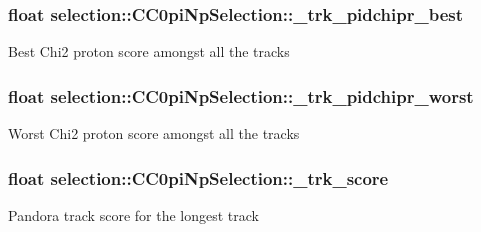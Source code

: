 \subsubsection[{\texorpdfstring{\+\_\+trk\+\_\+pidchipr\+\_\+best}{_trk_pidchipr_best}}]{\setlength{\rightskip}{0pt plus 5cm}float selection\+::\+C\+C0pi\+Np\+Selection\+::\+\_\+trk\+\_\+pidchipr\+\_\+best\hspace{0.3cm}{\ttfamily [private]}}\hypertarget{classselection_1_1CC0piNpSelection_aaf0a2841494bc52da55d267bc3c8db3d}{}\label{classselection_1_1CC0piNpSelection_aaf0a2841494bc52da55d267bc3c8db3d}
Best Chi2 proton score amongst all the tracks 
\subsubsection[{\texorpdfstring{\+\_\+trk\+\_\+pidchipr\+\_\+worst}{_trk_pidchipr_worst}}]{\setlength{\rightskip}{0pt plus 5cm}float selection\+::\+C\+C0pi\+Np\+Selection\+::\+\_\+trk\+\_\+pidchipr\+\_\+worst\hspace{0.3cm}{\ttfamily [private]}}\hypertarget{classselection_1_1CC0piNpSelection_a6c06ff43f89cbee19cf466b830a6fe38}{}\label{classselection_1_1CC0piNpSelection_a6c06ff43f89cbee19cf466b830a6fe38}
Worst Chi2 proton score amongst all the tracks 
\subsubsection[{\texorpdfstring{\+\_\+trk\+\_\+score}{_trk_score}}]{\setlength{\rightskip}{0pt plus 5cm}float selection\+::\+C\+C0pi\+Np\+Selection\+::\+\_\+trk\+\_\+score\hspace{0.3cm}{\ttfamily [private]}}\hypertarget{classselection_1_1CC0piNpSelection_a72517a224dc19f95faef3efde9a999d1}{}\label{classselection_1_1CC0piNpSelection_a72517a224dc19f95faef3efde9a999d1}
Pandora track score for the longest track 

